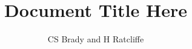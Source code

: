 \title{Document Title Here}
\author{CS Brady and H Ratcliffe}
\newcommand{\newsubtitle}{Subtitle}
\newcommand{\typesettername}{H Ratcliffe}
